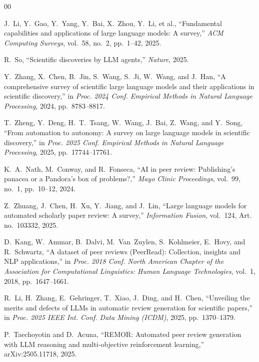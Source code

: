 \documentclass[preprint,10pt,times]{elsarticle}
\begin{document}

\clearpage
\begin{thebibliography}{00}

J.~Li, Y.~Gao, Y.~Yang, Y.~Bai, X.~Zhou, Y.~Li, et al.,
``Fundamental capabilities and applications of large language models: A survey,''
\textit{ACM Computing Surveys}, vol.~58, no.~2, pp.~1--42, 2025.

R.~So,
``Scientific discoveries by LLM agents,''
\textit{Nature}, 2025.

Y.~Zhang, X.~Chen, B.~Jin, S.~Wang, S.~Ji, W.~Wang, and J.~Han,
``A comprehensive survey of scientific large language models and their applications in scientific discovery,''
in \textit{Proc. 2024 Conf. Empirical Methods in Natural Language Processing}, 2024, pp.~8783--8817.

T.~Zheng, Y.~Deng, H.~T.~Tsang, W.~Wang, J.~Bai, Z.~Wang, and Y.~Song,
``From automation to autonomy: A survey on large language models in scientific discovery,''
in \textit{Proc. 2025 Conf. Empirical Methods in Natural Language Processing}, 2025, pp.~17744--17761.

K.~A.~Nath, M.~Conway, and R.~Fonseca,
``AI in peer review: Publishing's panacea or a Pandora's box of problems?,''
\textit{Mayo Clinic Proceedings}, vol.~99, no.~1, pp.~10--12, 2024.

Z.~Zhuang, J.~Chen, H.~Xu, Y.~Jiang, and J.~Lin,
``Large language models for automated scholarly paper review: A survey,''
\textit{Information Fusion}, vol.~124, Art. no.~103332, 2025.

D.~Kang, W.~Ammar, B.~Dalvi, M.~Van~Zuylen, S.~Kohlmeier, E.~Hovy, and R.~Schwartz,
``A dataset of peer reviews (PeerRead): Collection, insights and NLP applications,''
in \textit{Proc. 2018 Conf. North American Chapter of the Association for Computational Linguistics: Human Language Technologies}, vol.~1, 2018, pp.~1647--1661.

R.~Li, H.~Zhang, E.~Gehringer, T.~Xiao, J.~Ding, and H.~Chen,
``Unveiling the merits and defects of LLMs in automatic review generation for scientific papers,''
in \textit{Proc. 2025 IEEE Int. Conf. Data Mining (ICDM)}, 2025, pp.~1370--1379.

P.~Taechoyotin and D.~Acuna,
``REMOR: Automated peer review generation with LLM reasoning and multi-objective reinforcement learning,''
arXiv:2505.11718, 2025.


\end{thebibliography}
\end{document}
